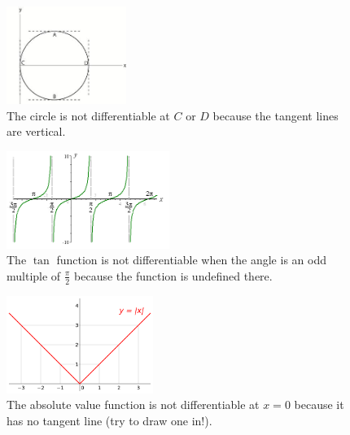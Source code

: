 \begin{figure}[h]
  \begin{minipage}{0.5\textwidth}
  \begin{center}
    \includegraphics[height=120px]{circle}\\
    \small{The circle is not differentiable at $ C $ or $ D $ because the tangent lines are vertical.}
  \end{center}
  \end{minipage}
  \begin{minipage}{0.5\textwidth}
  \begin{center}
    \includegraphics[height=120px]{tan}\\
    \small{The $ \tan $ function is not differentiable when the angle is an odd multiple of $ \frac{\pi}{2} $ because the function is undefined there.}
  \end{center}
  \end{minipage}
  \begin{minipage}{0.5\textwidth}
  \begin{center}
    \includegraphics[height=120px]{abs}\\
    \small{The absolute value function is not differentiable at $ x = 0 $ because it has no tangent line (try to draw one in!).}
  \end{center}
  \end{minipage}
  \begin{minipage}{0.5\textwidth}
  \begin{center}

\end{center}
\end{minipage}
\end{figure}
